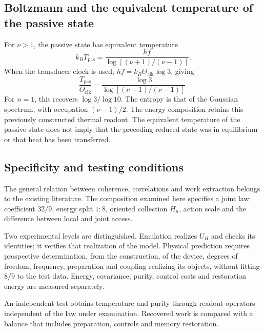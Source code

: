 \subsection{Boltzmann and the equivalent temperature of the passive state}
\label{md:aux:temperatura}

For $\nu>1$, the passive state has equivalent temperature
\begin{equation}
 k_BT_{\mathrm{pas}}
 =\frac{hf}{\log[(\nu+1)/(\nu-1)]}.
 \label{md:aux:temperatura-pasiva}
\end{equation}
When the transducer clock is used,
$hf=k_B\Theta_{\mathrm{clk}}\log3$, giving
\begin{equation}
 \frac{T_{\mathrm{pas}}}{\Theta_{\mathrm{clk}}}
 =\frac{\log3}{\log[(\nu+1)/(\nu-1)]}.
 \label{md:aux:razon-temperaturas}
\end{equation}
For $n=1$, this recovers $\log3/\log10$.
The entropy is that of the Gaussian spectrum, with occupation
$(\nu-1)/2$.
The energy composition retains this previously constructed thermal
readout. The equivalent temperature of the passive state does not imply
that the preceding reduced state was in equilibrium or that heat has
been transferred.

\subsection{Specificity and testing conditions}
\label{md:aux:contraste-trabajo}

The general relation between coherence, correlations and work
extraction belongs to the existing literature.
The composition examined here specifies a joint law: coefficient
$32/9$, energy split $1:8$, oriented collection $H_n$, action scale and
the difference between local and joint access.

Two experimental levels are distinguished. Emulation realizes $U_H$
and checks its identities; it verifies that realization of the model.
Physical prediction requires prospective determination, from the
construction, of the device, degrees of freedom, frequency, preparation
and coupling realizing its objects, without fitting $8/9$ to the test
data. Energy, covariance, purity, control costs and restoration energy
are measured separately.

An independent test obtains temperature and purity through readout
operators independent of the law under examination. Recovered work is
compared with a balance that includes preparation, controls and
memory restoration.

